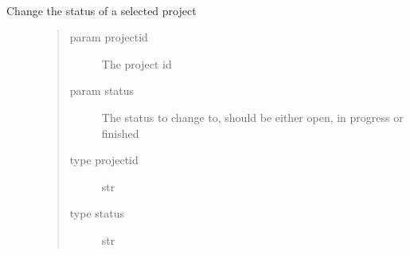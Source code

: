 \documentclass[letterpaper,10pt,english]{sphinxmanual}
\begin{document}

\begin{fulllineitems}
\label{\detokenize{index:models.project.update_project_status}}~\begin{description}
\item[{Change the status of a selected project}] \leavevmode\begin{quote}\begin{description}
\item[{param projectid}] \leavevmode
The project id

\item[{param status}] \leavevmode
The status to change to, should be either open, in progress or finished

\item[{type projectid}] \leavevmode
str

\item[{type status}] \leavevmode
str

\end{description}\end{quote}

\end{description}

\end{fulllineitems}

\label{\detokenize{index:module-models.register}}
\end{document}
